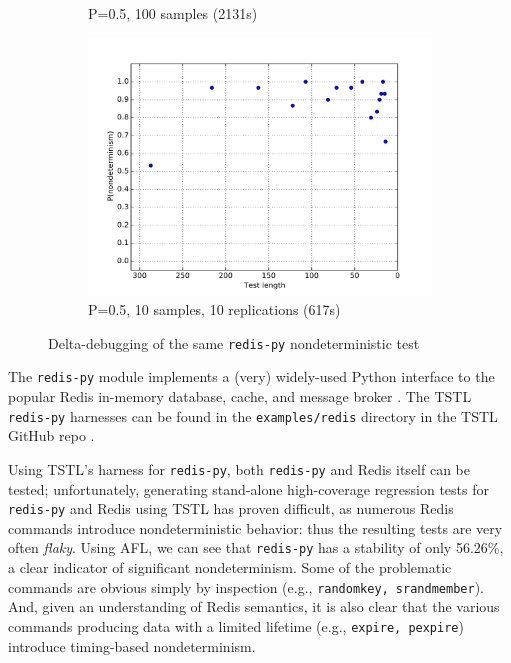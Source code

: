 \begin{figure}
\begin{subfigure}{0.3\columnwidth}
\caption{P=0.5, 100 samples (2131s)}
\label{fig:r2}
\end{subfigure}
\begin{subfigure}{0.3\columnwidth}
\centering
\includegraphics[width=\columnwidth]{redisforceprep}
\caption{P=0.5, 10 samples, 10 replications (617s)}
\label{fig:r3}
\end{subfigure}
\caption{Delta-debugging of the same {\tt redis-py} nondeterministic test}
\end{figure}

The {\tt redis-py} \cite{redispy} module implements a (very) widely-used Python interface
to the popular Redis in-memory database, cache, and
message broker \cite{redis}.  The TSTL {\tt redis-py} harnesses can be found in
the {\tt examples/redis} directory in the TSTL GitHub repo \cite{tstl}.

Using TSTL's harness for {\tt redis-py}, both {\tt redis-py} and Redis
itself can be tested; unfortunately, generating stand-alone
high-coverage regression tests for {\tt redis-py} and Redis using TSTL
has proven difficult, as numerous Redis commands introduce nondeterministic
behavior:  thus the resulting tests are very often \emph{flaky}.
Using AFL, we can see that {\tt redis-py} has a 
stability of only 56.26\%, a clear indicator of significant nondeterminism. Some
of the problematic commands are obvious simply by inspection (e.g.,
{\tt randomkey, srandmember}).  And, given an understanding of Redis
semantics, it is also clear that the various
commands producing data with a limited lifetime (e.g., {\tt expire,
  pexpire}) introduce timing-based nondeterminism.


